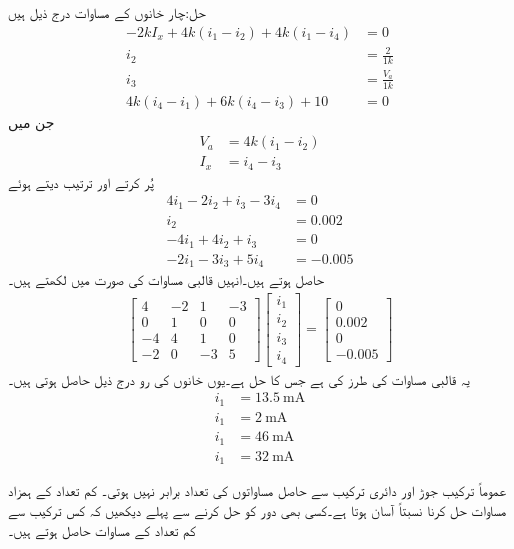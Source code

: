 حل:چار خانوں کے مساوات درج ذیل ہیں
\begin{align*}
-2k I_x+4k(i_1-i_2)+4k(i_1-i_4)&=0\\
i_2&=\frac{2}{1k}\\
i_3&=\frac{V_a}{1k}\\
4k(i_4-i_1)+6k(i_4-i_3)+10&=0
\end{align*}
جن میں
\begin{align*}
V_a&=4k(i_1-i_2)\\
I_x&=i_4-i_3
\end{align*}
پُر کرتے اور ترتیب  دیتے ہوئے
\begin{align*}
4i_1-2i_2+i_3-3i_4&=0\\
i_2&=0.002\\
-4i_1+4i_2+i_3&=0\\
-2i_1-3i_3+5i_4&=-0.005
\end{align*}
حاصل ہوتے ہیں۔انہیں قالبی مساوات کی صورت میں لکھتے ہیں۔
\begin{align*}
\begin{bmatrix*}
4 & -2 & 1 & -3\\
0& 1 & 0 & 0\\
-4 & 4 & 1 &0\\
-2&0&-3&5
\end{bmatrix*}
\begin{bmatrix}
i_1\\
i_2\\
i_3\\
i_4
\end{bmatrix}
=
\begin{bmatrix}
0\\
0.002\\
0\\
-0.005 
\end{bmatrix}
\end{align*}
یہ قالبی مساوات  کی طرز کی ہے جس کا حل  ہے۔یوں خانوں کی رو درج ذیل حاصل ہوتی ہیں۔
\begin{align*}
i_1&=\SI{13.5}{\milli\ampere}\\
i_1&=\SI{2}{\milli\ampere}\\
i_1&=\SI{46}{\milli\ampere}\\
i_1&=\SI{32}{\milli\ampere}
\end{align*}

عموماً ترکیب جوڑ اور دائری ترکیب سے حاصل مساواتوں کی تعداد برابر نہیں ہوتی۔ کم تعداد کے ہمزاد مساوات حل کرنا نسبتاً آسان ہوتا ہے۔کسی بھی دور کو حل کرنے سے پہلے دیکھیں کہ کس ترکیب سے کم تعداد کے مساوات حاصل ہوتے ہیں۔

